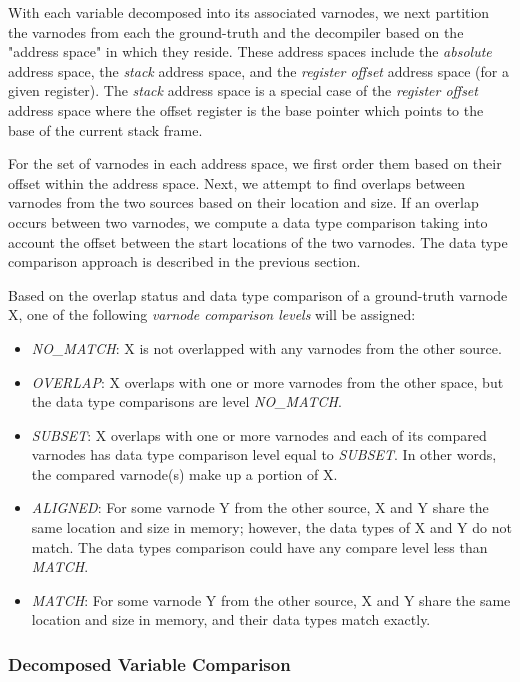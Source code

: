 With each variable decomposed into its associated varnodes, we next partition the varnodes from each the ground-truth and the decompiler based on the "address space" in which they reside. These address spaces include the \emph{absolute} address space, the \emph{stack} address space, and the \emph{register offset} address space (for a given register). The \emph{stack} address space is a special case of the \emph{register offset} address space where the offset register is the base pointer which points to the base of the current stack frame.

For the set of varnodes in each address space, we first order them based on their offset within the address space. Next, we attempt to find overlaps between varnodes from the two sources based on their location and size. If an overlap occurs between two varnodes, we compute a data type comparison taking into account the offset between the start locations of the two varnodes. The data type comparison approach is described in the previous section.

Based on the overlap status and data type comparison of a ground-truth varnode X, one of the following \emph{varnode comparison levels} will be assigned:

\begin{itemize}
    \item \emph{NO\_MATCH}: X is not overlapped with any varnodes from the other source.
    \item \emph{OVERLAP}: X overlaps with one or more varnodes from the other space, but the data type comparisons are level \emph{NO\_MATCH}.
    \item \emph{SUBSET}: X overlaps with one or more varnodes and each of its compared varnodes has data type comparison level equal to \emph{SUBSET}. In other words, the compared varnode(s) make up a portion of X.
    \item \emph{ALIGNED}: For some varnode Y from the other source, X and Y share the same location and size in memory; however, the data types of X and Y do not match. The data types comparison could have any compare level less than \emph{MATCH}.
    \item \emph{MATCH}: For some varnode Y from the other source, X and Y share the same location and size in memory, and their data types match exactly.
\end{itemize}

\subsubsection{Decomposed Variable Comparison}

